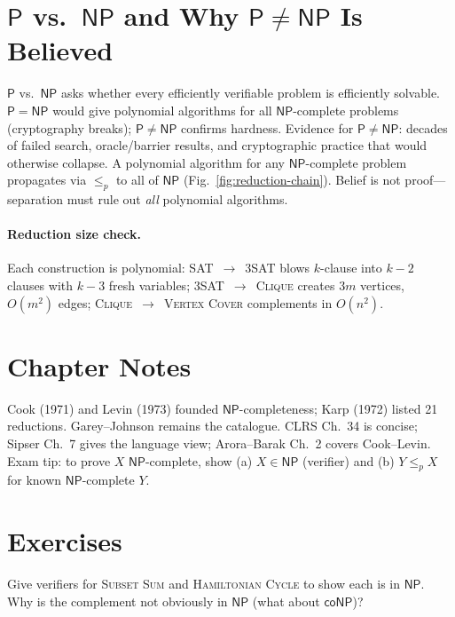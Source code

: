 \section{\texorpdfstring{$\mathsf{P}$ vs.\ $\mathsf{NP}$ and Why $\mathsf{P}\neq\mathsf{NP}$ Is Believed}{P vs. NP and Why P != NP Is Believed}}
\label{sec:p-vs-np}
$\mathsf{P}$ vs.\ $\mathsf{NP}$ asks whether every efficiently verifiable problem is efficiently solvable. $\mathsf{P}=\mathsf{NP}$ would give polynomial algorithms for all $\mathsf{NP}$-complete problems (cryptography breaks); $\mathsf{P}\neq\mathsf{NP}$ confirms hardness. Evidence for $\mathsf{P}\neq\mathsf{NP}$: decades of failed search, oracle/barrier results, and cryptographic practice that would otherwise collapse. A polynomial algorithm for any $\mathsf{NP}$-complete problem propagates via $\le_p$ to all of $\mathsf{NP}$ (Fig.~\ref{fig:reduction-chain}). Belief is not proof---separation must rule out \emph{all} polynomial algorithms.

\paragraph{Reduction size check.} Each construction is polynomial: SAT~$\to$~3SAT blows $k$-clause into $k{-}2$ clauses with $k{-}3$ fresh variables; 3SAT~$\to$~\textsc{Clique} creates $3m$ vertices, $O(m^2)$ edges; \textsc{Clique}~$\to$~\textsc{Vertex Cover} complements in $O(n^2)$.

\section{Chapter Notes}
Cook (1971) and Levin (1973) founded $\mathsf{NP}$-completeness; Karp (1972) listed 21 reductions. Garey--Johnson remains the catalogue. CLRS Ch.~34 is concise; Sipser Ch.~7 gives the language view; Arora--Barak Ch.~2 covers Cook--Levin. Exam tip: to prove $X$ $\mathsf{NP}$-complete, show (a) $X\in\mathsf{NP}$ (verifier) and (b) $Y\le_p X$ for known $\mathsf{NP}$-complete $Y$.

\section{Exercises}
\label{sec:ch08-exercises}

\begin{exercise}
Give verifiers for \textsc{Subset Sum} and \textsc{Hamiltonian Cycle} to show each is in $\mathsf{NP}$. Why is the complement not obviously in $\mathsf{NP}$ (what about $\mathsf{coNP}$)?
\end{exercise}

